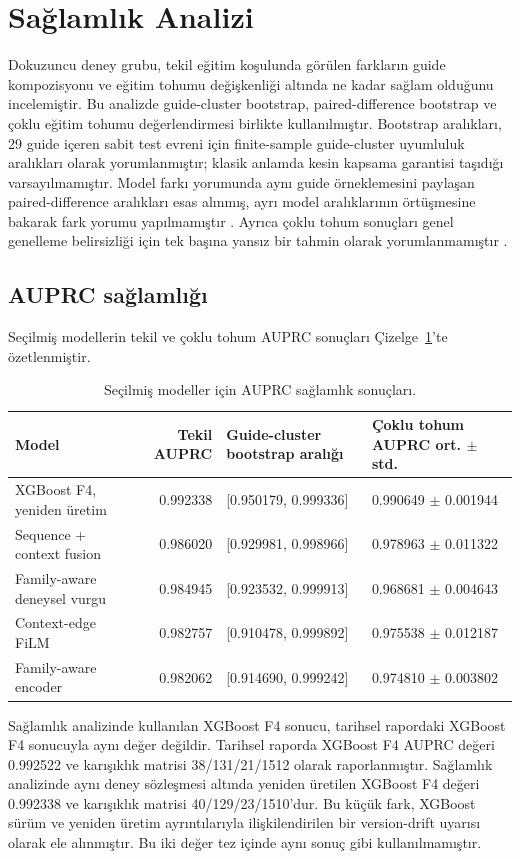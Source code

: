 \section{Sağlamlık Analizi}

Dokuzuncu deney grubu, tekil eğitim koşulunda görülen farkların guide kompozisyonu ve eğitim tohumu değişkenliği altında ne kadar sağlam olduğunu incelemiştir. Bu analizde guide-cluster bootstrap, paired-difference bootstrap ve çoklu eğitim tohumu değerlendirmesi birlikte kullanılmıştır. Bootstrap aralıkları, 29 guide içeren sabit test evreni için finite-sample guide-cluster uyumluluk aralıkları olarak yorumlanmıştır; klasik anlamda kesin kapsama garantisi taşıdığı varsayılmamıştır. Model farkı yorumunda aynı guide örneklemesini paylaşan paired-difference aralıkları esas alınmış, ayrı model aralıklarının örtüşmesine bakarak fark yorumu yapılmamıştır . Ayrıca çoklu tohum sonuçları genel genelleme belirsizliği için tek başına yansız bir tahmin olarak yorumlanmamıştır .

\subsection{AUPRC sağlamlığı}

Seçilmiş modellerin tekil ve çoklu tohum AUPRC sonuçları Çizelge~\ref{tab:auprc-saglamlik}'te özetlenmiştir.

\begin{table}[htbp]
\caption{Seçilmiş modeller için AUPRC sağlamlık sonuçları.}
\label{tab:auprc-saglamlik}
\centering
\scriptsize
\begin{tabularx}{\textwidth}{>{\raggedright\arraybackslash}X r l l}
\toprule\toprule
Model & Tekil AUPRC & Guide-cluster bootstrap aralığı & Çoklu tohum AUPRC ort. $\pm$ std.\\
\midrule
XGBoost F4, yeniden üretim & 0.992338 & [0.950179, 0.999336] & 0.990649 $\pm$ 0.001944\\
Sequence + context fusion & 0.986020 & [0.929981, 0.998966] & 0.978963 $\pm$ 0.011322\\
Family-aware deneysel vurgu & 0.984945 & [0.923532, 0.999913] & 0.968681 $\pm$ 0.004643\\
Context-edge FiLM & 0.982757 & [0.910478, 0.999892] & 0.975538 $\pm$ 0.012187\\
Family-aware encoder & 0.982062 & [0.914690, 0.999242] & 0.974810 $\pm$ 0.003802\\
\bottomrule
\end{tabularx}
\end{table}
Sağlamlık analizinde kullanılan XGBoost F4 sonucu, tarihsel rapordaki XGBoost F4 sonucuyla aynı değer değildir. Tarihsel raporda XGBoost F4 AUPRC değeri 0.992522 ve karışıklık matrisi 38/131/21/1512 olarak raporlanmıştır. Sağlamlık analizinde aynı deney sözleşmesi altında yeniden üretilen XGBoost F4 değeri 0.992338 ve karışıklık matrisi 40/129/23/1510'dur. Bu küçük fark, XGBoost sürüm ve yeniden üretim ayrıntılarıyla ilişkilendirilen bir version-drift uyarısı olarak ele alınmıştır. Bu iki değer tez içinde aynı sonuç gibi kullanılmamıştır.

